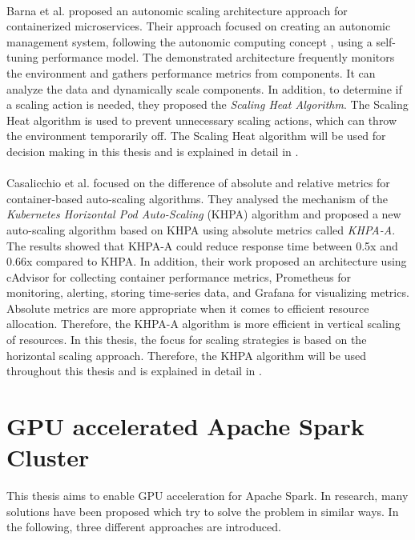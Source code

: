 \paragraph{}Barna et al. \cite{Barna2017ElasticContainerApps} proposed an autonomic scaling architecture approach for containerized microservices. Their approach focused on creating an autonomic management system, following the autonomic computing concept \cite{Kephart2003VisionComputing}, using a self-tuning performance model. The demonstrated architecture frequently monitors the environment and gathers performance metrics from components. It can analyze the data and dynamically scale components. In addition, to determine if a scaling action is needed, they proposed the \textit{Scaling Heat Algorithm}. The Scaling Heat algorithm is used to prevent unnecessary scaling actions, which can throw the environment temporarily off.
The Scaling Heat algorithm will be used for decision making in this thesis and is explained in detail in .


\paragraph{}Casalicchio et al. \cite{Casalicchio2017AutoScaleCont} focused on the difference of absolute and relative metrics for container-based auto-scaling algorithms. They analysed the mechanism of the \textit{Kubernetes Horizontal Pod Auto-Scaling} (KHPA) algorithm and proposed a new auto-scaling algorithm based on KHPA using absolute metrics called \textit{KHPA-A}. The results showed that KHPA-A could reduce response time between 0.5x and 0.66x compared to KHPA. In addition, their work proposed an architecture using cAdvisor for collecting container performance metrics, Prometheus for monitoring, alerting, storing time-series data, and Grafana for visualizing metrics. 
Absolute metrics are more appropriate when it comes to efficient resource allocation. Therefore, the KHPA-A algorithm is more efficient in vertical scaling of resources.
In this thesis, the focus for scaling strategies is based on the horizontal scaling approach. Therefore, the KHPA algorithm will be used throughout this thesis and is explained in detail in .


\section{GPU accelerated Apache Spark Cluster}
This thesis aims to enable GPU acceleration for Apache Spark.
In research, many solutions have been proposed which try to solve the problem in similar ways.
In the following, three different approaches are introduced.


